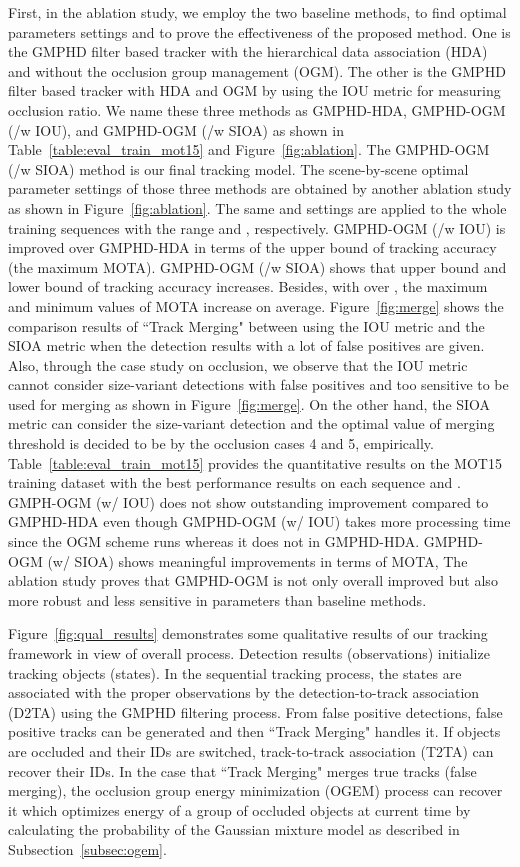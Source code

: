 \documentclass[journal]{IEEEtran}
\newcounter{ct}
\begin{document}
First, in the ablation study, we employ the two baseline methods, to find optimal parameters settings and to prove the effectiveness of the proposed method. One is the GMPHD filter based tracker with the hierarchical data association (HDA) and without the occlusion group management (OGM). The other is the GMPHD filter based tracker with HDA and OGM by using the IOU metric for measuring occlusion ratio. We name these three methods as GMPHD-HDA, GMPHD-OGM (/w IOU), and GMPHD-OGM (/w SIOA) as shown in Table~\ref{table:eval_train_mot15} and Figure~\ref{fig:ablation}. The GMPHD-OGM (/w SIOA) method is our final tracking model. 
The scene-by-scene optimal parameter settings of those three methods are obtained by another ablation study as shown in Figure~\ref{fig:ablation}. The same  and  settings are applied to the whole training sequences with the range  and , respectively. GMPHD-OGM (/w IOU) is improved over GMPHD-HDA in terms of the upper bound of tracking accuracy (the maximum MOTA). GMPHD-OGM (/w SIOA) shows that upper bound and lower bound of tracking accuracy increases. Besides, with  over , the maximum and minimum values of MOTA increase on average. 
Figure~\ref{fig:merge} shows the comparison results of ``Track Merging" between using the IOU metric and the SIOA metric when the detection results with a lot of false positives are given. Also, through the case study on occlusion, we observe that the IOU metric cannot consider size-variant detections with false positives and too sensitive to be used for merging as shown in Figure~\ref{fig:merge}. On the other hand, the SIOA metric can consider the size-variant detection and the optimal value of merging threshold  is decided to be  by the occlusion cases 4 and 5, empirically.
Table~\ref{table:eval_train_mot15} provides the quantitative results on the MOT15 training dataset with the best performance results on each sequence and . GMPH-OGM (w/ IOU) does not show outstanding improvement compared to GMPHD-HDA even though GMPHD-OGM (w/ IOU) takes more processing time since the OGM scheme runs whereas it does not in GMPHD-HDA. GMPHD-OGM (w/ SIOA) shows meaningful improvements in terms of MOTA,
The ablation study proves that GMPHD-OGM is not only overall improved but also more robust and less sensitive in parameters than baseline methods. 

Figure~\ref{fig:qual_results} demonstrates some qualitative results of our tracking framework in view of overall process.
Detection results (observations) initialize tracking objects (states).
In the sequential tracking process, the states are associated with the proper observations by the detection-to-track association (D2TA) using the GMPHD filtering process. 
From false positive detections, false positive tracks can be generated and then ``Track Merging" handles it.
If objects are occluded and their IDs are switched, track-to-track association (T2TA) can recover their IDs. 
In the case that ``Track Merging" merges true tracks (false merging), the occlusion group energy minimization (OGEM) process can recover it which optimizes energy of a group of occluded objects at current time by calculating the probability of the Gaussian mixture model as described in Subsection~\ref{subsec:ogem}.
\end{document}
